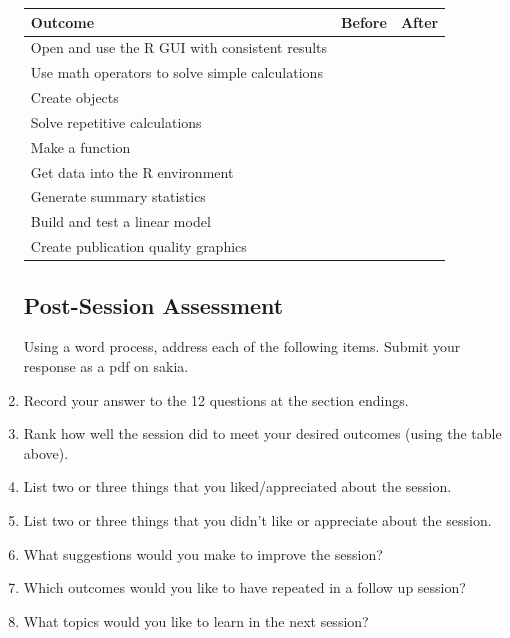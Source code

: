 \documentclass{tufte-handout}\usepackage[]{graphicx}\usepackage[]{color}
\begin{document}
\begin{fullwidth}
\begin{enumerate}
\begin{table}
		\begin{tabular}{|l|l|l|} \toprule
Outcome						& Before & After \\ \midrule
Open and use the R GUI with consistent results 		&& \\
Use math operators to solve simple calculations		&& \\
Create objects																		& &\\
Solve repetitive calculations										&	& \\
Make a function																		&& \\
Get data into the R environment										&& \\
Generate summary statistics												& &\\
Build and test a linear model										&	& \\
Create publication quality graphics								&& \\
		\bottomrule
		\end{tabular}
\end{table}

\subsection{Post-Session Assessment}

Using a word process, address each of the following items. Submit your response as a pdf on sakia. 

\item Record your answer to the 12 questions at the section endings.

\item Rank how well the session did to meet your desired outcomes (using the table above).

\item List two or three things that you liked/appreciated about the session.

\vspace{.7in}

\item List two or three things that you didn't like or appreciate about the session.



\vspace{.7in}
\item What suggestions would you make to improve the session?

\vspace{.7in}
\item Which outcomes would you like to have repeated in a follow up session?
\vspace{.7in}


\item What topics would you like to learn in the next session?

\end{enumerate}
\end{fullwidth}
\end{document}
